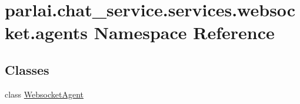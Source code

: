 \hypertarget{namespaceparlai_1_1chat__service_1_1services_1_1websocket_1_1agents}{}\section{parlai.\+chat\+\_\+service.\+services.\+websocket.\+agents Namespace Reference}
\label{namespaceparlai_1_1chat__service_1_1services_1_1websocket_1_1agents}
\subsection*{Classes}
\begin{DoxyCompactItemize}
\item 
class \hyperlink{classparlai_1_1chat__service_1_1services_1_1websocket_1_1agents_1_1WebsocketAgent}{Websocket\+Agent}
\end{DoxyCompactItemize}
